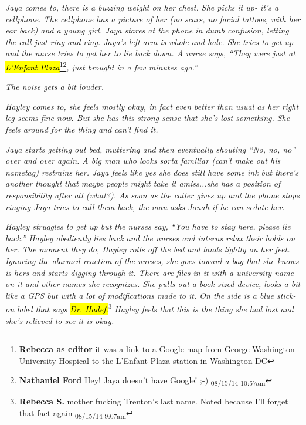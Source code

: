 \textit{Jaya comes to, there is a buzzing weight on her chest.  She picks it up- it's a cellphone.  The cellphone has a picture of her (}\textit{no scars, no facial tattoos, with her ear back}\textit{) and a young girl.  Jaya stares at the phone in dumb confusion, letting the call just ring and ring.  Jaya's left arm is whole and hale.  She tries to get up and the nurse tries to get her to lie back down.  A nurse says, ``They were just at \hl{L'Enfant Plaza}}\footnote{\textbf{Rebecca as editor} it was a link to a Google map from George Washington University Hospical to the L'Enfant Plaza station in Washington DC}\footnote{\textbf{Nathaniel Ford }Hey! Jaya doesn't have Google! ;-) \textsubscript{08/15/14 10:57am}}\textit{, just brought in a few minutes ago.''}



\textit{The noise gets a bit louder.  }



\textit{Hayley comes to, she feels mostly okay, in fact even better than usual as her right leg seems fine now.  But she has this strong sense that she's lost something.  She feels around for the thing and can't find it. }



\textit{Jaya starts getting out bed, muttering and then eventually shouting ``No, no, no'' over and over again.  A big man who looks sorta familiar (can't make out his nametag) restrains her.  Jaya feels like yes she does still have some ink but there's another thought that maybe people might take it amiss...she has a position of responsibility after all (what?).  As soon as the caller gives up and the phone stops ringing Jaya tries to call them back, the man asks Jonah if he can sedate her.}



\textit{Hayley struggles to get up but the nurses say, ``You have to stay here, please lie back.''  Hayley obediently lies back and the nurses and interns relax their holds on her.  The moment they do, Hayley rolls off the bed and lands lightly on her feet.  Ignoring the alarmed reaction of the nurses, she goes toward a bag that she knows is hers and starts digging through it.  There are files in it with a university name on it and other names she recognizes.  She pulls out a book-sized device, looks a bit like a GPS but with a lot of modifications made to it.  On the side is a blue stick-on label that says }\textit{\hl{Dr. Hadef.}}\footnote{\textbf{Rebecca S. }mother fucking Trenton's last name. Noted because I'll forget that fact again \textsubscript{08/15/14 9:07am}}\textit{  Hayley feels that this is the thing she had lost and she's relieved to see it is okay. }



